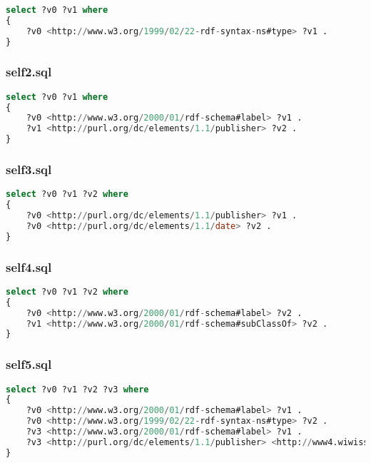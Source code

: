 \documentclass[titlepage, a4paper, 12pt] {article}
\begin{document}
\begin{lstlisting}[language=SQL] 
select ?v0 ?v1 where
{
	?v0 <http://www.w3.org/1999/02/22-rdf-syntax-ns#type> ?v1 .
}
\end{lstlisting}

\subsubsection{self2.sql}

\begin{lstlisting}[language=SQL] 
select ?v0 ?v1 where
{
	?v0 <http://www.w3.org/2000/01/rdf-schema#label> ?v1 .
	?v1 <http://purl.org/dc/elements/1.1/publisher> ?v2 .
}
\end{lstlisting}

\subsubsection{self3.sql}

\begin{lstlisting}[language=SQL] 
select ?v0 ?v1 ?v2 where
{
	?v0 <http://purl.org/dc/elements/1.1/publisher> ?v1 .
	?v0 <http://purl.org/dc/elements/1.1/date> ?v2 .
}
\end{lstlisting}

\subsubsection{self4.sql}

\begin{lstlisting}[language=SQL] 
select ?v0 ?v1 ?v2 where
{
	?v0 <http://www.w3.org/2000/01/rdf-schema#label> ?v2 .
	?v1 <http://www.w3.org/2000/01/rdf-schema#subClassOf> ?v2 .
}
\end{lstlisting}

\subsubsection{self5.sql}

\begin{lstlisting}[language=SQL] 
select ?v0 ?v1 ?v2 ?v3 where
{
	?v0 <http://www.w3.org/2000/01/rdf-schema#label> ?v1 .
	?v0 <http://www.w3.org/1999/02/22-rdf-syntax-ns#type> ?v2 .
	?v3 <http://www.w3.org/2000/01/rdf-schema#label> ?v1 .
	?v3 <http://purl.org/dc/elements/1.1/publisher> <http://www4.wiwiss.fu-berlin.de/bizer/bsbm/v01/instances/StandardizationInstitution1> .
}
\end{lstlisting}
\end{document}
